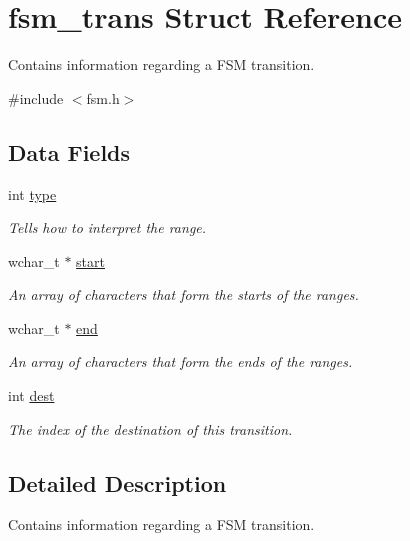 \hypertarget{structfsm__trans}{\section{fsm\-\_\-trans \-Struct \-Reference}
\label{structfsm__trans}
}


\-Contains information regarding a \-F\-S\-M transition.  




{\ttfamily \#include $<$fsm.\-h$>$}

\subsection*{\-Data \-Fields}
\begin{DoxyCompactItemize}
\item 
int \hyperlink{structfsm__trans_ac765329451135abec74c45e1897abf26}{type}
\begin{DoxyCompactList}\small\item\em \-Tells how to interpret the range. \end{DoxyCompactList}\item 
wchar\-\_\-t $\ast$ \hyperlink{structfsm__trans_a57644b772e7a7502cf7bae92933f1dee}{start}
\begin{DoxyCompactList}\small\item\em \-An array of characters that form the starts of the ranges. \end{DoxyCompactList}\item 
wchar\-\_\-t $\ast$ \hyperlink{structfsm__trans_aa1e2bbde6a40f4d42da0674048ea3099}{end}
\begin{DoxyCompactList}\small\item\em \-An array of characters that form the ends of the ranges. \end{DoxyCompactList}\item 
\hypertarget{structfsm__trans_ae5163ff230abd4115d86194ad89467b5}{int \hyperlink{structfsm__trans_ae5163ff230abd4115d86194ad89467b5}{dest}}\label{structfsm__trans_ae5163ff230abd4115d86194ad89467b5}

\begin{DoxyCompactList}\small\item\em \-The index of the destination of this transition. \end{DoxyCompactList}\end{DoxyCompactItemize}


\subsection{\-Detailed \-Description}
\-Contains information regarding a \-F\-S\-M transition. 

